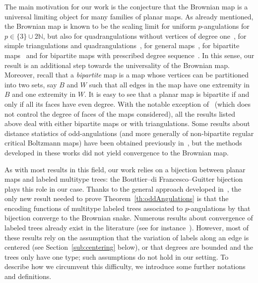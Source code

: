 \documentclass[AHL,Unicode,longabstracts,published]{cedram}
\providecommand{\N}{}
\renewcommand{\N}{\mathbb{N}}
\begin{document}
The main motivation for our work is the conjecture that the Brownian map is a universal limiting object for many families of planar maps. As already mentioned, the Brownian map is known to be the scaling limit for uniform $p$-angulations for $p\in \{3\}\cup 2\N$, but also for quadrangulations without vertices of degree one~\cite{beltran13quad}, for simple triangulations and quadrangulations~\cite{AddarioAlbenqueSimple}, for general maps~\cite{BettinelliJacobMiermont}, for bipartite maps~\cite{AbrahamBipartite} and for bipartite maps with prescribed degree sequence~\cite{MarzoukPrescribed}. In this sense, our result is an additional step towards the universality of the Brownian map. Moreover, recall that a \emph{bipartite} map is a map whose vertices can be partitioned into two sets, say $B$ and $W$ such that all edges in the map have one extremity in $B$ and one extremity in $W$. It is easy to see that a planar map is bipartite if and only if all its faces have even degree. With the notable exception of~\cite{BettinelliJacobMiermont} (which does not control the degree of faces of the maps considered), all the results listed above deal with either bipartite maps or with triangulations. Some results about distance statistics of odd-angulations (and more generally of non-bipartite regular critical Boltzmann maps) have been obtained previously in~\cite{MiermontInvariance,MiermontWeill}, but the methods developed in these works did not yield convergence to the Brownian map.

As with most results in this field, our work relies on a bijection between planar maps and labeled multitype trees: the Bouttier--di Francesco--Guitter bijection~\cite{BDG2004} plays this role in our case. Thanks to the general approach developed in~\cite{LeGallUniqueness}, the only new result needed to prove Theorem~\ref{th:oddAngulations} is that the encoding functions of multitype labeled trees associated to $p$-angulations by that bijection converge to the Brownian snake. Numerous results about convergence of labeled trees already exist in the literature (see for instance~\cite{MarckertLineage,MiermontInvarianceTrees}). However, most of these results rely on the assumption that the variation of labels along an edge is centered (see Section~\ref{sub:centering} below), or that degrees are bounded and the trees only have one type; such assumptions do not hold in our setting. To describe how we circumvent this difficulty, we introduce some further notations and definitions.
\end{document}
